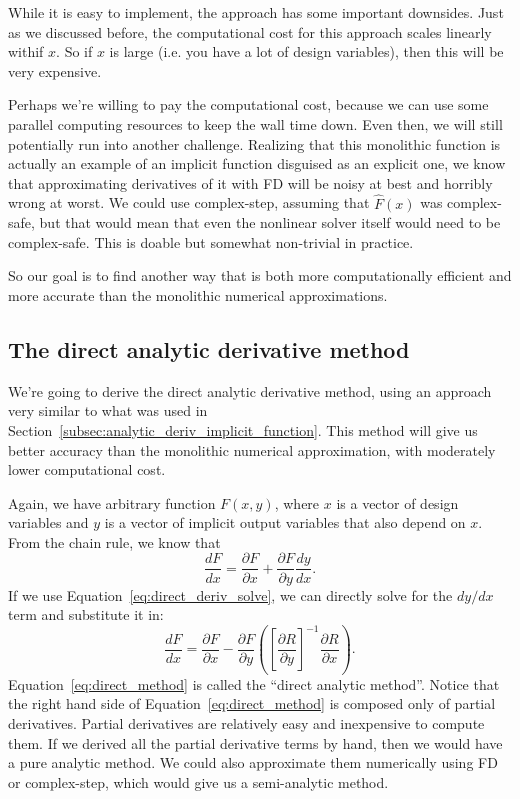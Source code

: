 \documentclass[conf]{new-aiaa}
\begin{document}
    While it is easy to implement, the approach has some important downsides. 
    Just as we discussed before, the computational cost for this approach scales linearly withif $x$. 
    So if $x$ is large (i.e. you have a lot of design variables), then this will be very expensive. 
    
    Perhaps we're willing to pay the computational cost, because we can use some parallel computing resources to keep the wall time down. 
    Even then, we will still potentially run into another challenge. 
    Realizing that this monolithic function is actually an example of an implicit function disguised as an explicit one, 
    we know that approximating derivatives of it with FD will be noisy at best and horribly wrong at worst. 
    We could use complex-step, assuming that  $\hat{F}(x)$ was complex-safe, but that would mean that even the nonlinear solver itself would need to be complex-safe. 
    This is doable but somewhat non-trivial in practice. 
    
    So our goal is to find another way that is both more computationally efficient and more accurate than the monolithic numerical approximations. 

    \subsection{The direct analytic derivative method}

    We're going to derive the direct analytic derivative method, using an approach very similar to what was used in Section~\ref{subsec:analytic_deriv_implicit_function}. 
    This method will give us better accuracy than the monolithic numerical approximation, with moderately lower computational cost. 

    Again, we have arbitrary function $F(x,y)$, where $x$ is a vector of design variables and $y$ is a vector of implicit output variables that also depend on $x$. 
    From the chain rule, we know that
    \begin{equation}
      \frac{d F}{d x} = \frac{\partial F}{\partial x} + \frac{\partial F}{\partial y}\frac{d y}{d x} .
      \label{eq:direct_chain_rule}
    \end{equation} 
    If we use Equation~\eqref{eq:direct_deriv_solve}, we can directly solve for the $dy/dx$ term and substitute it in: 
    \begin{equation}
      \frac{d F}{d x} = \frac{\partial F}{\partial x} - \frac{\partial F}{\partial y} \left( \left[\frac{\partial R}{\partial y}\right]^{-1} \frac{\partial R}{\partial x} \right).
      \label{eq:direct_method}
    \end{equation}
    Equation~\ref{eq:direct_method} is called the ``direct analytic method''. 
    Notice that the right hand side of Equation~\ref{eq:direct_method} is composed only of partial derivatives. 
    Partial derivatives are relatively easy and inexpensive to compute them. 
    If we derived all the partial derivative terms by hand, then we would have a pure analytic method. 
    We could also approximate them numerically using FD or complex-step, which would give us a semi-analytic method. 
\end{document}
